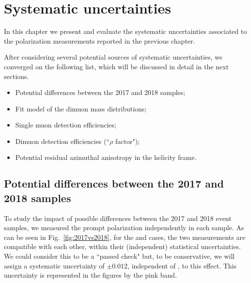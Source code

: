 \section{Systematic uncertainties}
\label{sec:syst}

In this chapter we present and evaluate the systematic uncertainties associated 
to the polarization measurements reported in the previous chapter.

After considering several potential sources of systematic uncertainties,
we converged on the following list, which will be discussed in detail in the next sections.
\begin{itemize}
\item Potential differences between the 2017 and 2018 samples;
\item Fit model of the dimuon mass distributions;
\item Single muon detection efficiencies;
\item Dimuon detection efficiencies (``$\rho$ factor");
\item Potential residual azimuthal anisotropy in the helicity frame.
\end{itemize}

\subsection{Potential differences between the 2017 and 2018 samples}

To study the impact of possible differences between the 2017 and 2018 event samples,
we measured the prompt \jpsi polarization independently in each sample.
As can be seen in Fig.~\ref{fig:2017vs2018}, for the \jpsi and \psip cases,
the two measurements are compatible with each other, 
within their (independent) statistical uncertainties.
We could consider this to be a ``passed check" but, to be conservative, 
we will assign a systematic uncertainty of $\pm 0.012$, independent of \pt,
to this effect. This uncertainty is represented in the figures by the pink band.

